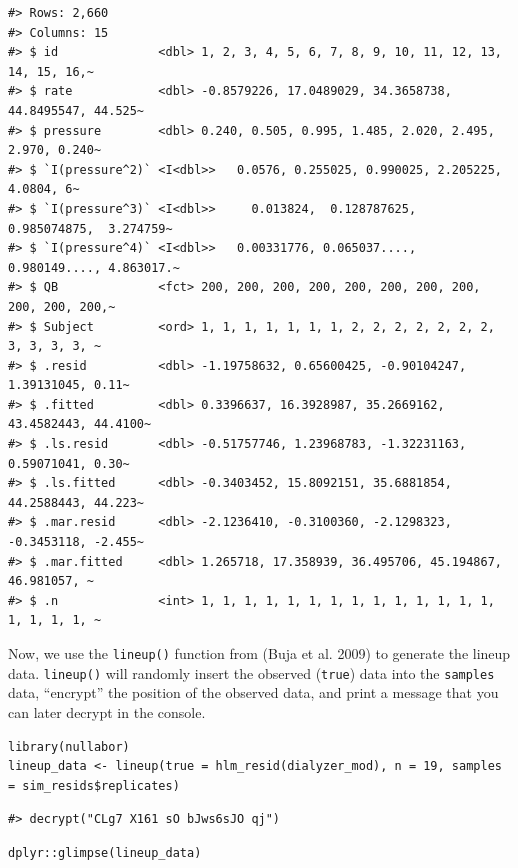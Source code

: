 \begin{verbatim}
#> Rows: 2,660
#> Columns: 15
#> $ id              <dbl> 1, 2, 3, 4, 5, 6, 7, 8, 9, 10, 11, 12, 13, 14, 15, 16,~
#> $ rate            <dbl> -0.8579226, 17.0489029, 34.3658738, 44.8495547, 44.525~
#> $ pressure        <dbl> 0.240, 0.505, 0.995, 1.485, 2.020, 2.495, 2.970, 0.240~
#> $ `I(pressure^2)` <I<dbl>>   0.0576, 0.255025, 0.990025, 2.205225,   4.0804, 6~
#> $ `I(pressure^3)` <I<dbl>>     0.013824,  0.128787625,  0.985074875,  3.274759~
#> $ `I(pressure^4)` <I<dbl>>   0.00331776, 0.065037...., 0.980149...., 4.863017.~
#> $ QB              <fct> 200, 200, 200, 200, 200, 200, 200, 200, 200, 200, 200,~
#> $ Subject         <ord> 1, 1, 1, 1, 1, 1, 1, 2, 2, 2, 2, 2, 2, 2, 3, 3, 3, 3, ~
#> $ .resid          <dbl> -1.19758632, 0.65600425, -0.90104247, 1.39131045, 0.11~
#> $ .fitted         <dbl> 0.3396637, 16.3928987, 35.2669162, 43.4582443, 44.4100~
#> $ .ls.resid       <dbl> -0.51757746, 1.23968783, -1.32231163, 0.59071041, 0.30~
#> $ .ls.fitted      <dbl> -0.3403452, 15.8092151, 35.6881854, 44.2588443, 44.223~
#> $ .mar.resid      <dbl> -2.1236410, -0.3100360, -2.1298323, -0.3453118, -2.455~
#> $ .mar.fitted     <dbl> 1.265718, 17.358939, 36.495706, 45.194867, 46.981057, ~
#> $ .n              <int> 1, 1, 1, 1, 1, 1, 1, 1, 1, 1, 1, 1, 1, 1, 1, 1, 1, 1, ~
\end{verbatim}

Now, we use the \texttt{lineup()} function from  (Buja et al. 2009) to generate the lineup data. \texttt{lineup()} will randomly insert the observed (\texttt{true}) data into the \texttt{samples} data, ``encrypt'' the position of the observed data, and print a message that you can later decrypt in the console.

\begin{verbatim}
library(nullabor)
lineup_data <- lineup(true = hlm_resid(dialyzer_mod), n = 19, samples = sim_resids$replicates)
\end{verbatim}

\begin{verbatim}
#> decrypt("CLg7 X161 sO bJws6sJO qj")
\end{verbatim}

\begin{verbatim}
dplyr::glimpse(lineup_data)
\end{verbatim}

